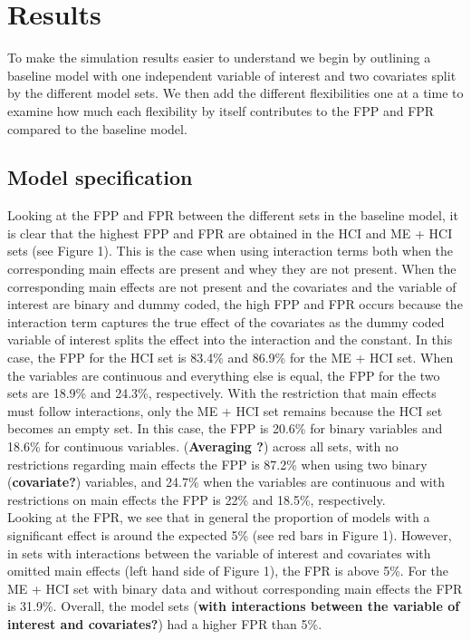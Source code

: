 \section{Results} 
To make the simulation results easier to understand we begin by outlining a baseline model with one independent  variable of interest and two covariates split by the different model sets. We then add the different flexibilities one at a time to examine how much each flexibility by itself contributes to the FPP and FPR compared to the baseline model.

\subsection{Model specification}
Looking at the FPP and FPR between the different sets in the baseline model, it is clear that the highest FPP and FPR are obtained in the HCI and ME + HCI sets (see Figure 1). This is the case when using interaction terms both when the corresponding main effects are present and whey they are not present. When the corresponding main effects are not present and the covariates and the variable of interest are binary and dummy coded, the high FPP and FPR occurs because the interaction term  captures the true effect of the covariates as the dummy coded variable of interest splits the effect into the interaction and the constant. In this case, the FPP for the HCI set is 83.4\% and 86.9\% for the ME + HCI set. When the variables are continuous and everything else is equal, the FPP for the two sets are 18.9\% and 24.3\%, respectively. With the restriction that main effects must follow interactions, only the ME + HCI set remains because the HCI set becomes an empty set. In this case, the FPP is 20.6\% for binary variables and 18.6\% for continuous variables. (\textbf{Averaging ?}) across all sets, with no restrictions regarding main effects the FPP  is 87.2\% when using two binary (\textbf{covariate?}) variables, and 24.7\% when the variables are continuous and with restrictions on main effects the FPP is 22\% and 18.5\%, respectively.\\ 
Looking at the FPR, we see that in general the proportion of models with a significant effect is around the expected 5\%  (see red bars in Figure 1). However, in sets with interactions between the variable of interest and covariates with omitted main effects (left hand side of Figure 1), the FPR is above 5\%. For the ME + HCI set with binary data and without corresponding main effects the FPR is 31.9\%. Overall, the model sets (\textbf{with interactions between the variable of interest and covariates?}) had a higher FPR than 5\%. \\

